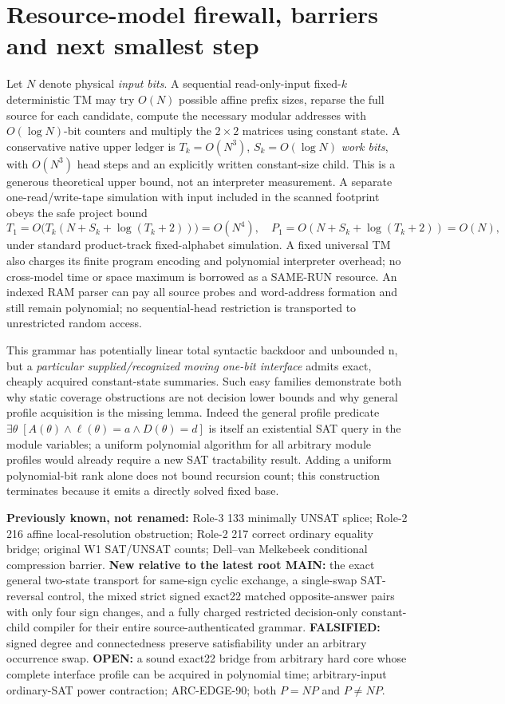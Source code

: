 \documentclass[11pt]{article}
\begin{document}
\section{Resource-model firewall, barriers and next smallest step}
Let $N$ denote physical \emph{input bits}. A sequential read-only-input fixed-$k$ deterministic TM may try $O(N)$ possible affine prefix sizes, reparse the full source for each candidate, compute the necessary modular addresses with $O(\log N)$-bit counters and multiply the $2\times2$ matrices using constant state. A conservative native upper ledger is $T_k=O(N^3)$, $S_k=O(\log N)$ \emph{work bits}, with $O(N^3)$ head steps and an explicitly written constant-size child. This is a generous theoretical upper bound, not an interpreter measurement. A separate one-read/write-tape simulation with input included in the scanned footprint obeys the safe project bound
\[
T_1=O\bigl(T_k(N+S_k+\log(T_k+2))\bigr)=O(N^4),\quad
P_1=O(N+S_k+\log(T_k+2))=O(N),
\]
under standard product-track fixed-alphabet simulation. A fixed universal TM also charges its finite program encoding and polynomial interpreter overhead; no cross-model time or space maximum is borrowed as a SAME-RUN resource. An indexed RAM parser can pay all source probes and word-address formation and still remain polynomial; no sequential-head restriction is transported to unrestricted random access.

This grammar has potentially linear total syntactic backdoor and unbounded n, but a \emph{particular supplied/recognized moving one-bit interface} admits exact, cheaply acquired constant-state summaries. Such easy families demonstrate both why static coverage obstructions are not decision lower bounds and why general profile acquisition is the missing lemma. Indeed the general profile predicate
\(\exists\theta\;[A(\theta)\wedge\ell(\theta)=a\wedge D(\theta)=d]\)
is itself an existential SAT query in the module variables; a uniform polynomial algorithm for all arbitrary module profiles would already require a new SAT tractability result. Adding a uniform polynomial-bit rank alone does not bound recursion count; this construction terminates because it emits a directly solved fixed base.

\textbf{Previously known, not renamed:} Role-3 133 minimally UNSAT splice; Role-2 216 affine local-resolution obstruction; Role-2 217 correct ordinary equality bridge; original W1 SAT/UNSAT counts; Dell--van Melkebeek conditional compression barrier. \textbf{New relative to the latest root MAIN:} the exact general two-state transport for same-sign cyclic exchange, a single-swap SAT-reversal control, the mixed strict signed exact22 matched opposite-answer pairs with only four sign changes, and a fully charged restricted decision-only constant-child compiler for their entire source-authenticated grammar. \textbf{FALSIFIED:} signed degree and connectedness preserve satisfiability under an arbitrary occurrence swap. \textbf{OPEN:} a sound exact22 bridge from arbitrary hard core whose complete interface profile can be acquired in polynomial time; arbitrary-input ordinary-SAT power contraction; ARC-EDGE-90; both $P=NP$ and $P\ne NP$.
\end{document}
